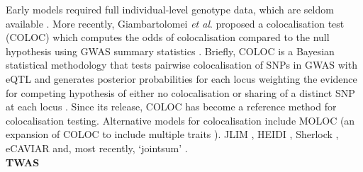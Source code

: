 Early models \cite{plagnol2009statistical, wallace2012statistical, nica2010candidate} required full individual-level genotype data, which are seldom available \cite{cano2020gwas}.
More recently, Giambartolomei \textit{et al}. proposed a  colocalisation test (COLOC) which computes the odds of colocalisation compared to the null hypothesis using GWAS summary statistics \cite{giambartolomei2014bayesian}. 
Briefly, COLOC is a Bayesian statistical methodology that tests pairwise colocalisation of SNPs in GWAS with eQTL and generates posterior probabilities for each locus weighting the evidence for competing hypothesis of either no colocalisation or sharing of a distinct SNP at each locus \cite{guo2015integration}.
Since its release, COLOC has become a reference method for colocalisation testing. 
Alternative models for colocalisation include 
MOLOC (an expansion of COLOC to include multiple traits \cite{giambartolomei2018bayesian}).
JLIM \cite{chun2017limited}, 
HEIDI \cite{zhu2016integration}, 
Sherlock \cite{he2013sherlock},
eCAVIAR \cite{hormozdiari2016colocalization} 
and, most recently, `jointsum' \cite{deng2020powerful}.\\




\textbf{TWAS}


